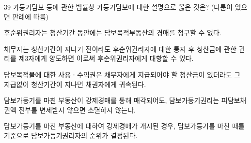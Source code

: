 \begin{question}{39}
가등기담보 등에 관한 법률상 가등기담보에 대한 설명으로 옳은 것은? (다툼이 있으면 판례에 따름)
\begin{choices}
  \item 후순위권리자는 청산기간 동안에는 담보목적부동산의 경매를 청구할 수 없다.
  \item 채무자는 청산기간이 지나기 전이라도 후순위권리자에 대한 통지 후 청산금에 관한 권리를 제3자에게 양도하면 이로써 후순위권리자에게 대항할 수 있다.
  \item 담보목적물에 대한 사용ㆍ수익권은 채무자에게 지급되어야 할 청산금이 있더라도 그 지급없이 청산기간이 지나면 채권자에게 귀속된다.
  \item 담보가등기를 마친 부동산이 강제경매를 통해 매각되어도, 담보가등기권리는 피담보채권액 전부를 변제받지 않으면 소멸하지 않는다.
  \item 담보가등기를 마친 부동산에 대하여 강제경매가 개시된 경우, 담보가등기를 마친 때를 기준으로 담보가등기권리자의 순위가 결정된다.
\end{choices}
\end{question}
